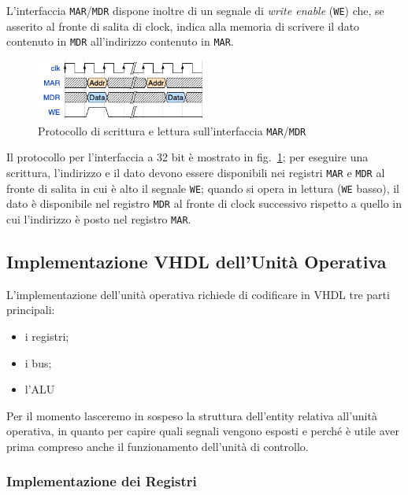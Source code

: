 \documentclass[a4paper,12pt]{scrreprt}
\begin{document}
L'interfaccia \lstinline{MAR}/\lstinline{MDR} dispone inoltre di un segnale di
\textit{write enable} (\lstinline{WE}) che, se asserito al fronte di salita di
clock, indica alla memoria di scrivere il dato contenuto in \lstinline{MDR}
all'indirizzo contenuto in \lstinline{MAR}.

\begin{figure}
  \centering
  \includegraphics[width=0.5\textwidth]{mem_prot.png}
  \caption{Protocollo di scrittura e lettura sull'interfaccia
    \lstinline{MAR}/\lstinline{MDR}}\label{fig:mem_prot}
\end{figure}

Il protocollo per l'interfaccia a 32 bit è mostrato in fig.~\ref{fig:mem_prot};
per eseguire una scrittura, l'indirizzo e il dato devono essere disponibili nei
registri \lstinline{MAR} e \lstinline{MDR} al fronte di salita in cui è alto il
segnale \lstinline{WE}; quando si opera in lettura (\lstinline{WE} basso), il
dato è disponibile nel registro \lstinline{MDR} al fronte di clock successivo
rispetto a quello in cui l'indirizzo è posto nel registro \lstinline{MAR}.

\subsection{Implementazione VHDL dell'Unità Operativa}

L'implementazione dell'unità operativa richiede di codificare in VHDL tre
parti principali:
\begin{itemize}
  \item i registri;
  \item i bus;
  \item l'ALU
\end{itemize}

\begin{mynote}{}{}
  Per il momento lasceremo in sospeso la struttura dell'entity relativa
  all'unità operativa, in quanto per capire quali segnali vengono esposti e
  perché è utile aver prima compreso anche il funzionamento dell'unità di
  controllo.
\end{mynote}

\subsubsection{Implementazione dei Registri}
\end{document}
